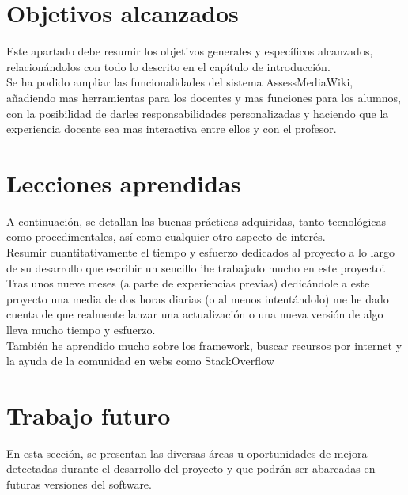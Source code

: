 

\section{Objetivos alcanzados}
Este apartado debe resumir los objetivos generales y específicos alcanzados, relacionándolos con todo lo descrito en el capítulo de introducción.\\

Se ha podido ampliar las funcionalidades del sistema AssessMediaWiki, añadiendo mas herramientas para los docentes y mas funciones para los alumnos, con la posibilidad de darles responsabilidades personalizadas y haciendo que la experiencia docente sea mas interactiva entre ellos y con el profesor.

\section{Lecciones aprendidas}
A continuación, se detallan las buenas prácticas adquiridas, tanto tecnológicas como procedimentales, así como cualquier otro aspecto de interés.\\

Resumir cuantitativamente el tiempo y esfuerzo dedicados al proyecto a lo largo de su desarrollo que escribir un sencillo 'he trabajado mucho en este proyecto'.
Tras unos nueve meses (a parte de experiencias previas) dedicándole a este proyecto una media de dos horas diarias (o al menos intentándolo) me he dado cuenta de que realmente lanzar una actualización o una nueva versión de algo lleva mucho tiempo y esfuerzo.\\

También he aprendido mucho sobre los framework, buscar recursos por internet y la ayuda de la comunidad en webs como StackOverflow

\section{Trabajo futuro}
En esta sección, se presentan las diversas áreas u oportunidades de mejora detectadas durante el desarrollo del proyecto y que podrán ser abarcadas en futuras versiones del software.\\

